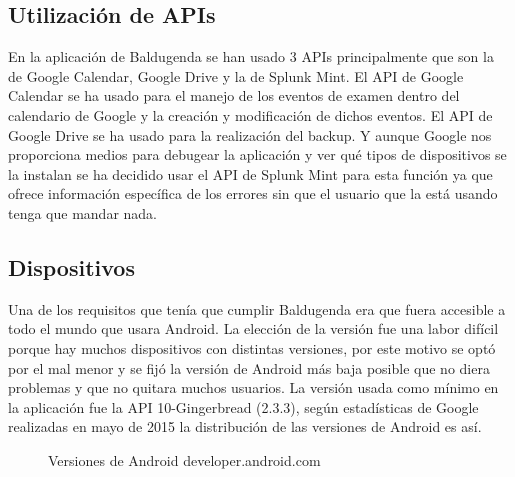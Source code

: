 \subsection{Utilización de APIs}
\label{subsecc:Utilización de APIs}

En la aplicación de Baldugenda se han usado 3 APIs principalmente que son la de Google Calendar, Google Drive y la de Splunk Mint.
El API de Google Calendar se ha usado para el manejo de los eventos de examen dentro del calendario de Google y la creación y modificación de dichos eventos.
El API de Google Drive se ha usado para la realización del backup.
Y aunque Google nos proporciona medios para debugear la aplicación y ver qué tipos de dispositivos se la instalan se ha decidido usar el API de Splunk Mint para esta función ya que ofrece información específica de los errores sin que el usuario que la está usando tenga que mandar nada.

\subsection{Dispositivos}
\label{subsecc:Dispositivos}

Una de los requisitos que tenía que cumplir Baldugenda era que fuera accesible a todo el mundo que usara Android. La elección de la versión fue una labor difícil porque hay muchos dispositivos con distintas versiones, por este motivo se optó por el mal menor y se fijó la versión de Android más baja posible que no diera problemas y que no quitara muchos usuarios.
La versión usada como mínimo en la aplicación fue la API 10-Gingerbread (2.3.3), según estadísticas de Google realizadas en mayo de 2015 la distribución de las versiones de Android es así.

\begin{figure}[H] 
  \begin{center} 
    \caption{Versiones de Android developer.android.com} 
    \label{fig:VersionesAndroid} 
  \end{center} 
\end{figure}

